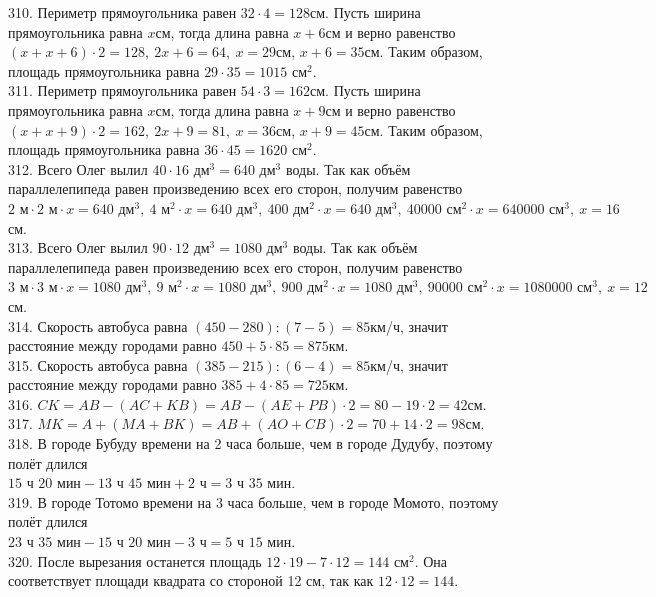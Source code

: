 \documentclass[12pt]{article}
\begin{document}
310. Периметр прямоугольника равен $32\cdot4=128$см. Пусть ширина прямоугольника равна $x$см, тогда длина равна $x+6$см и верно равенство $(x+x+6)\cdot2=128,\ 2x+6=64,\ x=29$см, $x+6=35$см. Таким образом, площадь прямоугольника равна $29\cdot35=1015\text{ см}^2.$\\
311. Периметр прямоугольника равен $54\cdot3=162$см. Пусть ширина прямоугольника равна $x$см, тогда длина равна $x+9$см и верно равенство $(x+x+9)\cdot2=162,\ 2x+9=81,\ x=36$см, $x+9=45$см. Таким образом, площадь прямоугольника равна $36\cdot45=1620\text{ см}^2.$\\
312. Всего Олег вылил $40\cdot16\text{ дм}^3=640\text{ дм}^3$ воды. Так как объём параллелепипеда равен произведению всех его сторон, получим равенство $2\text{ м}\cdot2\text{ м}\cdot x=640\text{ дм}^3,\ 4\text{ м}^2\cdot x=640\text { дм}^3,\ 400\text{ дм}^2\cdot x=640\text { дм}^3,\
40000\text{ см}^2\cdot x=640000\text { см}^3,\ x=16$см.\\
313. Всего Олег вылил $90\cdot12\text{ дм}^3=1080\text{ дм}^3$ воды. Так как объём параллелепипеда равен произведению всех его сторон, получим равенство $3\text{ м}\cdot3\text{ м}\cdot x=1080\text{ дм}^3,\ 9\text{ м}^2\cdot x=1080\text { дм}^3,\ 900\text{ дм}^2\cdot x=1080\text { дм}^3,\
90000\text{ см}^2\cdot x=1080000\text { см}^3,\ x=12$см.\\
314. Скорость автобуса равна $(450-280):(7-5)=85$км/ч, значит расстояние между городами равно $450+5\cdot85=875$км.\\
315. Скорость автобуса равна $(385-215):(6-4)=85$км/ч, значит расстояние между городами равно $385+4\cdot85=725$км.\\
316. $CK=AB-(AC+KB)=AB-(AE+PB)\cdot2=80-19\cdot2=42$см.\\
317. $MK=A+(MA+BK)=AB+(AO+CB)\cdot2=70+14\cdot2=98$см.\\
318. В городе Бубуду времени на 2 часа больше, чем в городе Дудубу, поэтому полёт длился\\ $15\text{ ч }20\text{ мин}-13\text{ ч }45\text{ мин}+2\text{ ч}=3\text{ ч }35\text{ мин}.$\\
319. В городе Тотомо времени на 3 часа больше, чем в городе Момото, поэтому полёт длился\\ $23\text{ ч }35\text{ мин}-15\text{ ч }20\text{ мин}-3\text{ ч}=5\text{ ч }15\text{ мин}.$\\
320. После вырезания останется площадь $12\cdot19-7\cdot12=144\text{ см}^2.$ Она соответствует площади квадрата со стороной 12 см, так как $12\cdot 12=144.$\\
\end{document}
